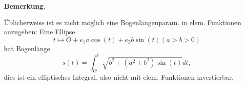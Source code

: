 \documentclass[a4paper,oneside,11pt,DIV=12,parskip=half]{scrartcl}
\newenvironment{note}{\textbf{Bemerkung.} ~~~~}{}
\begin{document}
\begin{note}
	
	Üblicherweise ist es nicht möglich eine Bogenlängenparam. in elem. Funktionen anzugeben: Eine Ellipse\[t \mapsto O + e_1a\cos(t)+e_2b\sin(t) (a>b>0)\]
	hat Bogenlänge
	\[s(t) = \int_{O}^{t} \sqrt{b^2 + ( a^2+b^2)\sin(t)}dt,\]
	dies ist ein elliptisches Integral, also nicht mit elem. Funktionen invertierbar.

\end{note}
\end{document}
